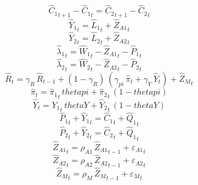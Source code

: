 \begin{dmath}
{{\hat{C}_{1}}}_{t+1}-{{\hat{C}_{1}}}_{t}={{\hat{C}_{2}}}_{t+1}-{{\hat{C}_{2}}}_{t}
\end{dmath}
\begin{dmath}
{{\hat{Y}_{1}}}_{t}={{\hat{L}_{1}}}_{t}+{{\hat{Z}_{A1}}}_{t}
\end{dmath}
\begin{dmath}
{{\hat{Y}_{2}}}_{t}={{\hat{L}_{2}}}_{t}+{{\hat{Z}_{A2}}}_{t}
\end{dmath}
\begin{dmath}
{{\hat{\lambda}_{1}}}_{t}={{\hat{W}_{1}}}_{t}-{{\hat{Z}_{A1}}}_{t}-{{\hat{P}_{1}}}_{t}
\end{dmath}
\begin{dmath}
{{\hat{\lambda}_{2}}}_{t}={{\hat{W}_{2}}}_{t}-{{\hat{Z}_{A2}}}_{t}-{{\hat{P}_{2}}}_{t}
\end{dmath}
\begin{dmath}
{{\hat{R}}}_{t}={{\gamma_{R}}}\, {{\hat{R}}}_{t-1}+\left(1-{{\gamma_{R}}}\right)\, \left({{\gamma_{pi}}}\, {{\hat{\pi}}}_{t}+{{\gamma_{Y}}}\, {{\hat{Y}}}_{t}\right)+{{\hat{Z}_M}}_{t}
\end{dmath}
\begin{dmath}
{{\hat{\pi}}}_{t}={{\hat{\pi}_{1}}}_{t}\, {thetapi}+{{\hat{\pi}_{2}}}_{t}\, \left(1-{thetapi}\right)
\end{dmath}
\begin{dmath}
{{\hat{Y}}}_{t}={{\hat{Y}_{1}}}_{t}\, {thetaY}+{{\hat{Y}_{2}}}_{t}\, \left(1-{thetaY}\right)
\end{dmath}
\begin{dmath}
{{\hat{P}_{1}}}_{t}+{{\hat{Y}_{1}}}_{t}={{\hat{C}_{1}}}_{t}+{{\hat{Q}_{1}}}_{t}
\end{dmath}
\begin{dmath}
{{\hat{P}_{2}}}_{t}+{{\hat{Y}_{2}}}_{t}={{\hat{C}_{2}}}_{t}+{{\hat{Q}_{1}}}_{t}
\end{dmath}
\begin{dmath}
{{\hat{Z}_{A1}}}_{t}={{\rho_{A1}}}\, {{\hat{Z}_{A1}}}_{t-1}+{{\varepsilon_{A1}}}_{t}
\end{dmath}
\begin{dmath}
{{\hat{Z}_{A2}}}_{t}={{\rho_{A2}}}\, {{\hat{Z}_{A2}}}_{t-1}+{{\varepsilon_{A2}}}_{t}
\end{dmath}
\begin{dmath}
{{\hat{Z}_M}}_{t}={{\rho_{M}}}\, {{\hat{Z}_M}}_{t-1}+{{\varepsilon_{M}}}_{t}
\end{dmath}
